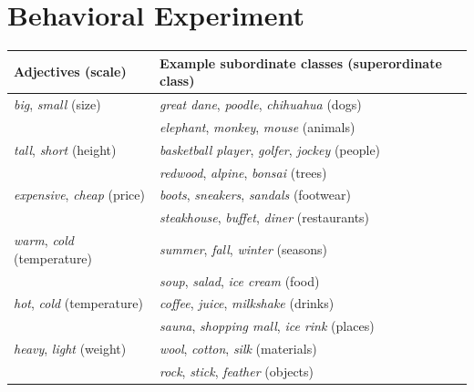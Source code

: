 \documentclass[doc]{apa6}
\begin{document}

\section{Behavioral Experiment}


\begin{table}[ht]
\centering
\begingroup\fontsize{10pt}{11pt}\selectfont
\begin{tabularx}{\textwidth}{lll}
  \hline
Adjectives (scale) & Example subordinate classes (superordinate class) \\ 
  \hline
  \emph{big}, \emph{small} (size) & \emph{great dane}, \emph{poodle}, \emph{chihuahua} (dogs) \\ 
						 & \emph{elephant}, \emph{monkey}, \emph{mouse} (animals) \\ 
\emph{tall}, \emph{short} (height) &  \emph{basketball player}, \emph{golfer}, \emph{jockey} (people) \\ 
							&  \emph{redwood}, \emph{alpine}, \emph{bonsai} (trees) \\ 
  \emph{expensive}, \emph{cheap} (price) & \emph{boots}, \emph{sneakers}, \emph{sandals} (footwear) \\ 
						   & \emph{steakhouse}, \emph{buffet}, \emph{diner} (restaurants) \\ 
    \emph{warm}, \emph{cold} (temperature) & \emph{summer}, \emph{fall}, \emph{winter} (seasons) \\ 
							& \emph{soup}, \emph{salad}, \emph{ice cream} (food) \\ 
    \emph{hot}, \emph{cold} (temperature) & \emph{coffee}, \emph{juice}, \emph{milkshake} (drinks) \\ 
								& \emph{sauna}, \emph{shopping mall}, \emph{ice rink} (places) \\ 
  \emph{heavy}, \emph{light} (weight) &  \emph{wool}, \emph{cotton}, \emph{silk} (materials) \\ 
							  &  \emph{rock}, \emph{stick}, \emph{feather} (objects) \\ 

\end{tabularx}
\end{table}
\end{document}
